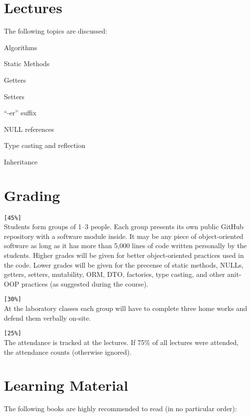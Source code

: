 \documentclass[nobrand,anonymous,nodate,nosecurity]{huawei}
\begin{document}
{\newpage
\section*{Lectures}

The following topics are discussed:

\begin{lectures}
\item Algorithms
\item Static Methods
\item Getters
\item Setters
\item ``-er'' suffix
\item NULL references
\item Type casting and reflection
\item Inheritance
\end{lectures}

\newpage
\section*{Grading}

\texttt{[45\%]} \\
Students form groups of 1--3 people. Each group presents
its own public GitHub repository with a software module inside.
It may be any piece of object-oriented software as long as it has more than 5,000 lines
of code written personally by the students.
Higher grades will be given
for better object-oriented practices used in the code. Lower grades will be
given for the precense of static methods, NULLs, getters, setters, mutability,
ORM, DTO, factories, type casting, and other anit-OOP practices (as suggested during the course).

\texttt{[30\%]} \\
At the laboratory classes each group will have to complete three
home works and defend them verbally on-site.

\texttt{[25\%]} \\
The attendance is tracked at the lectures. If 75\% of all lectures were attended,
the attendance counts (otherwise ignored).

\newpage
\section*{Learning Material}

The following books are highly recommended to read (in no particular order):

}
\end{document}
